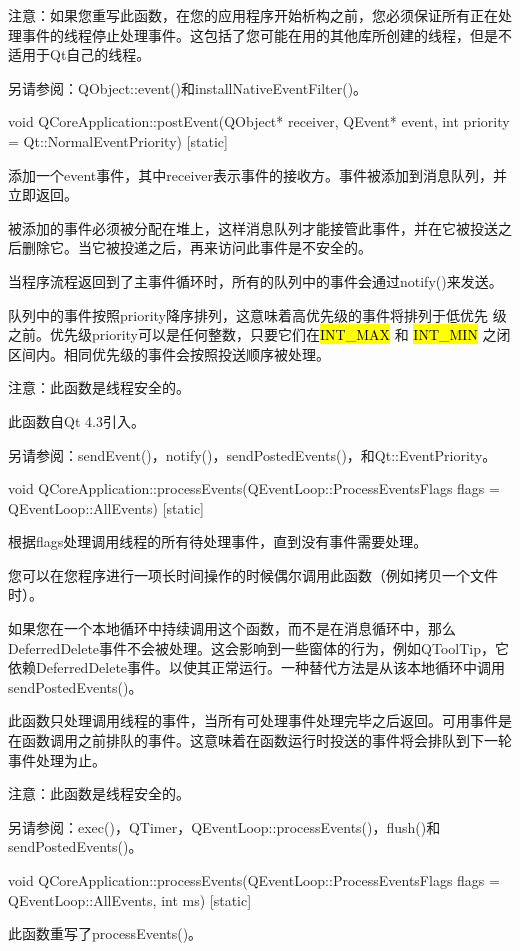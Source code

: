 注意：如果您重写此函数，在您的应用程序开始析构之前，您必须保证所有正在处理事件的线程停止处理事件。这包括了您可能在用的其他库所创建的线程，但是不适用于Qt自己的线程。

另请参阅：QObject::event()和installNativeEventFilter()。

void QCoreApplication::postEvent(QObject* receiver, QEvent* event, int priority = Qt::NormalEventPriority) [static]

添加一个event事件，其中receiver表示事件的接收方。事件被添加到消息队列，并立即返回。

被添加的事件必须被分配在堆上，这样消息队列才能接管此事件，并在它被投送之后删除它。当它被投递之后，再来访问此事件是不安全的。

当程序流程返回到了主事件循环时，所有的队列中的事件会通过notify()来发送。

队列中的事件按照priority降序排列，这意味着高优先级的事件将排列于低优先
级之前。优先级priority可以是任何整数，只要它们在\hl{INT\_MAX} 和
\hl{INT\_MIN} 之闭区间内。相同优先级的事件会按照投送顺序被处理。

注意：此函数是线程安全的。

此函数自Qt 4.3引入。

另请参阅：sendEvent()，notify()，sendPostedEvents()，和Qt::EventPriority。

void QCoreApplication::processEvents(QEventLoop::ProcessEventsFlags flags = QEventLoop::AllEvents) [static]

根据flags处理调用线程的所有待处理事件，直到没有事件需要处理。

您可以在您程序进行一项长时间操作的时候偶尔调用此函数（例如拷贝一个文件时）。

如果您在一个本地循环中持续调用这个函数，而不是在消息循环中，那么DeferredDelete事件不会被处理。这会影响到一些窗体的行为，例如QToolTip，它依赖DeferredDelete事件。以使其正常运行。一种替代方法是从该本地循环中调用sendPostedEvents()。

此函数只处理调用线程的事件，当所有可处理事件处理完毕之后返回。可用事件是在函数调用之前排队的事件。这意味着在函数运行时投送的事件将会排队到下一轮事件处理为止。

注意：此函数是线程安全的。

另请参阅：exec()，QTimer，QEventLoop::processEvents()，flush()和sendPostedEvents()。

void QCoreApplication::processEvents(QEventLoop::ProcessEventsFlags
flags = QEventLoop::AllEvents, int ms) [static]

此函数重写了processEvents()。


